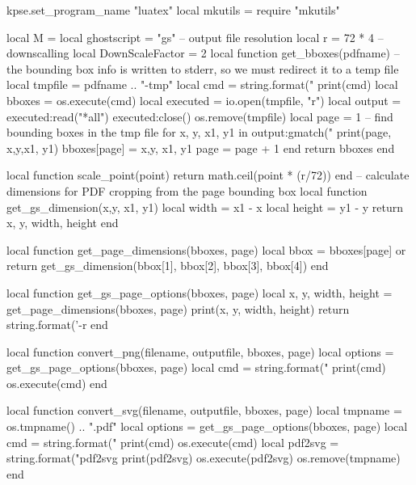 kpse.set_program_name "luatex"
local mkutils = require "mkutils"

local M = {}
local ghostscript = "gs"
-- output file resolution
local r = 72 * 4 
-- downscalling
local DownScaleFactor = 2 
local function get_bboxes(pdfname)
  -- the bounding box info is written to stderr, so we must redirect it to a temp file
  local tmpfile = pdfname .. "-tmp"
  local cmd = string.format("%
  print(cmd)
  local bboxes = {}
  os.execute(cmd)
  local executed = io.open(tmpfile, "r")
  local output = executed:read("*all")
  executed:close()
  os.remove(tmpfile)
  local page = 1
  -- find bounding boxes in the tmp file
  for x, y, x1, y1 in output:gmatch("%
    print(page, x,y,x1, y1)
    bboxes[page] = {x,y, x1, y1}
    page = page + 1
  end
  return bboxes
end

local function scale_point(point)
  return math.ceil(point * (r/72))
end
-- calculate dimensions for PDF cropping from the page bounding box
local function get_gs_dimension(x,y, x1, y1)
  local width = x1 - x
  local height = y1 - y
  return x, y, width, height
end

local function get_page_dimensions(bboxes, page)
  local bbox = bboxes[page] or {}
  return get_gs_dimension(bbox[1], bbox[2], bbox[3], bbox[4])
end

local function get_gs_page_options(bboxes, page)
  local x, y, width, height = get_page_dimensions(bboxes, page)
  print(x, y, width, height)
  return string.format('-r%
end

local function convert_png(filename, outputfile, bboxes, page)
  local options = get_gs_page_options(bboxes, page)
  local cmd = string.format("%
  print(cmd)
  os.execute(cmd)
end

local function convert_svg(filename, outputfile, bboxes, page)
  local tmpname = os.tmpname() .. ".pdf"
  local options = get_gs_page_options(bboxes, page)
  local cmd = string.format("%
  print(cmd)
  os.execute(cmd)
  local pdf2svg = string.format("pdf2svg %
  print(pdf2svg)
  os.execute(pdf2svg)
  os.remove(tmpname)
end

